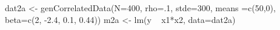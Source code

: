 \begin{Schunk}
\begin{Sinput}
 dat2a <- genCorrelatedData(N=400, rho=.1, stde=300, means =c(50,0), beta=c(2, -2.4, 0.1, 0.44))
 m2a <- lm(y ~ x1*x2, data=dat2a)
\end{Sinput}
\end{Schunk}
